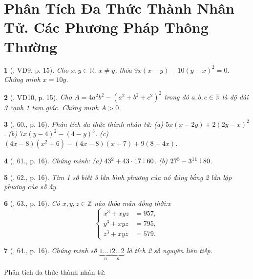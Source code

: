 \documentclass{article}
\newtheorem{baitoan}{}
\DeclareRobustCommand{\divby}{%
	\mathrel{\vbox{\baselineskip.65ex\lineskiplimit0pt\hbox{.}\hbox{.}\hbox{.}}}%
}
\begin{document}

\section{Phân Tích Đa Thức Thành Nhân Tử. Các Phương Pháp Thông Thường}

\begin{baitoan}[\cite{Tuyen_Toan_8}, VD9, p. 15]
	Cho $x,y\in\mathbb{R}$, $x\ne y$, thỏa $9x(x - y) - 10(y - x)^2 = 0$. Chứng minh $x = 10y$.
\end{baitoan}

\begin{baitoan}[\cite{Tuyen_Toan_8}, VD10, p. 15]
	Cho $A = 4a^2b^2 - (a^2 + b^2 + c^2)^2$ trong đó $a,b,c\in\mathbb{R}$ là độ dài 3 cạnh 1 tam giác. Chứng minh $A > 0$.
\end{baitoan}

\begin{baitoan}[\cite{Tuyen_Toan_8}, 60., p. 16]
	Phân tích đa thức thành nhân tử: (a) $5x(x - 2y) + 2(2y - x)^2$. (b) $7x(y - 4)^2 - (4 - y)^3$. (c) $(4x - 8)(x^2 + 6) - (4x - 8)(x + 7) + 9(8 - 4x)$.
\end{baitoan}

\begin{baitoan}[\cite{Tuyen_Toan_8}, 61., p. 16]
	Chứng minh: (a) $43^2 + 43\cdot17\divby60$. (b) $27^5 - 3^{11}\divby80$.
\end{baitoan}

\begin{baitoan}[\cite{Tuyen_Toan_8}, 62., p. 16]
	Tìm 1 số biết 3 lần bình phương của nó đúng bằng 2 lần lập phương của số ấy.
\end{baitoan}

\begin{baitoan}[\cite{Tuyen_Toan_8}, 63., p. 16]
	Có $x,y,z\in\mathbb{Z}$ nào thỏa mãn đồng thời:x
	\begin{equation*}
		\left\{\begin{split}
			x^3 + xyz &= 957,\\
			y^3 + xyz &= 795,\\
			z^3 + xyz &= 579.
		\end{split}\right.
	\end{equation*}
\end{baitoan}

\begin{baitoan}[\cite{Tuyen_Toan_8}, 64., p. 16]
	Chứng minh số $\underbrace{1\ldots1}_n\underbrace{2\ldots2}_n$ là tích 2 số nguyên liên tiếp.
\end{baitoan}
Phân tích đa thức thành nhân tử:
\end{document}
